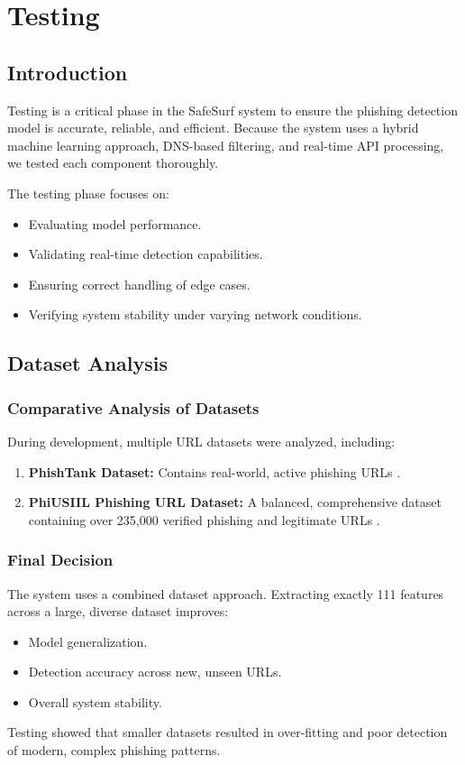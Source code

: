 \chapter{Testing}

\section{Introduction}

Testing is a critical phase in the SafeSurf system to ensure the phishing detection model is accurate, reliable, and efficient. Because the system uses a hybrid machine learning approach, DNS-based filtering, and real-time API processing, we tested each component thoroughly.

\noindent
The testing phase focuses on:
\begin{itemize}
    \item Evaluating model performance.
    \item Validating real-time detection capabilities.
    \item Ensuring correct handling of edge cases.
    \item Verifying system stability under varying network conditions.
\end{itemize}

\section{Dataset Analysis}

\subsection*{Comparative Analysis of Datasets}
\noindent
During development, multiple URL datasets were analyzed, including:
\begin{enumerate}
    \item \textbf{PhishTank Dataset:} Contains real-world, active phishing URLs \cite{ref4}.
    \item \textbf{PhiUSIIL Phishing URL Dataset:} A balanced, comprehensive dataset containing over 235,000 verified phishing and legitimate URLs \cite{ref5}.
\end{enumerate}

\subsection*{Final Decision}
\noindent
The system uses a combined dataset approach. Extracting exactly 111 features across a large, diverse dataset improves:
\begin{itemize}
    \item Model generalization.
    \item Detection accuracy across new, unseen URLs.
    \item Overall system stability.
\end{itemize}
\noindent
Testing showed that smaller datasets resulted in over-fitting and poor detection of modern, complex phishing patterns.

